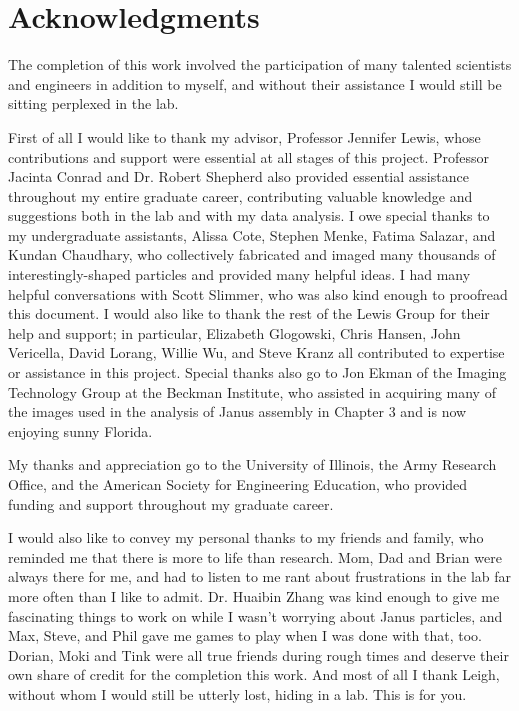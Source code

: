 \chapter*{Acknowledgments}

The completion of this work involved the participation of many 
talented scientists and engineers in addition to myself,
and without their assistance I would still be sitting perplexed in the lab.  

First of all I would like to thank my advisor, Professor Jennifer 
Lewis, whose contributions and support were essential at all 
stages of this project.  Professor Jacinta Conrad and Dr. Robert
Shepherd also provided essential assistance throughout my 
entire graduate career, contributing valuable knowledge and 
suggestions both in the lab and with my data analysis.  I owe
special thanks to my undergraduate assistants, Alissa Cote,
Stephen Menke, Fatima Salazar, and Kundan Chaudhary, who collectively 
fabricated and imaged many thousands of interestingly-shaped particles
and provided many helpful ideas.  I had many helpful conversations
with Scott Slimmer, who was also kind enough to proofread this
document.  I would also like to thank 
the rest of the Lewis Group for their help and support; in particular, 
Elizabeth Glogowski, Chris Hansen, John
Vericella, David Lorang, Willie Wu, and Steve Kranz all 
contributed to expertise or assistance in this project.
Special thanks also go to Jon
Ekman of the Imaging Technology Group at the Beckman Institute, who
assisted in acquiring many of the images used in the analysis of Janus
assembly in Chapter 3 and is now enjoying sunny Florida.

My thanks and appreciation go to the University of 
Illinois, the Army Research Office, and 
the American Society for Engineering Education, who provided
funding and support throughout my graduate career.

I would also like to convey my personal thanks to my friends and 
family, who reminded me that there is more to life than research.
Mom, Dad and Brian were always there for me, and had to listen to me rant
about frustrations in the lab far more often than I like to admit.
Dr. Huaibin Zhang was kind enough to give me fascinating things
to work on while I wasn't worrying about Janus particles, and Max,
Steve, and Phil gave me games to play when I was done with that, too.
Dorian, Moki and Tink were all true friends during rough times and 
deserve their own share of credit for the completion this work.
And most of all I thank Leigh, without whom I would still be 
utterly lost, hiding in a lab.  This is for you.
